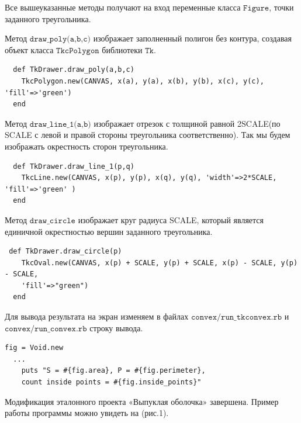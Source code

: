   Все вышеуказанные методы получают на вход переменные класса $\texttt{Figure}$, точки заданного треугольника.
  
  Метод $\texttt{draw\_poly(a,b,c)}$ изображает заполненный полигон без контура, создавая объект класса  $\texttt{TkcPolygon}$ библиотеки $\texttt{Tk}$.
\begin{small}
\begin{verbatim}
  def TkDrawer.draw_poly(a,b,c)
    TkcPolygon.new(CANVAS, x(a), y(a), x(b), y(b), x(c), y(c), 'fill'=>'green')
  end
\end{verbatim}
\end{small}

  Метод $\texttt{draw\_line\_1(a,b)}$ изображает отрезок с толщиной равной 2SCALE(по SCALE с левой и правой стороны треугольника соответственно). Так мы будем изображать окрестность сторон треугольника.
\begin{small}
\begin{verbatim}
  def TkDrawer.draw_line_1(p,q) 
    TkcLine.new(CANVAS, x(p), y(p), x(q), y(q), 'width'=>2*SCALE, 'fill'=>'green' )    
  end
\end{verbatim}
\end{small}

  Метод $\texttt{draw\_circle}$ изображает круг радиуса SCALE, который является единичной окрестностью вершин заданного треугольника.
\begin{small}
\begin{verbatim}
 def TkDrawer.draw_circle(p)
    TkcOval.new(CANVAS, x(p) + SCALE, y(p) + SCALE, x(p) - SCALE, y(p) - SCALE, 
    'fill'=>"green")
  end
\end{verbatim}
\end{small}

\newpage
Для вывода результата на экран изменяем в файлах $\texttt{convex/run\_tkconvex.rb}$ и $\texttt{convex/run\_convex.rb}$ строку вывода.
\begin{small}
\begin{verbatim}
fig = Void.new
  ...
    puts "S = #{fig.area}, P = #{fig.perimeter}, 
    count inside points = #{fig.inside_points}"
\end{verbatim}
\end{small}

Модификация эталонного проекта «Выпуклая оболочка» завершена. Пример работы программы можно увидеть на (рис.1).

